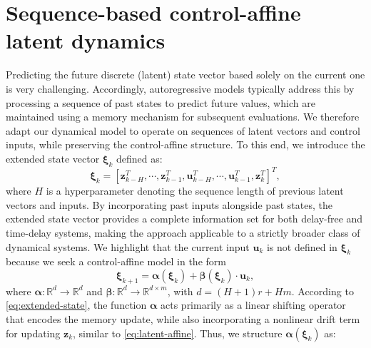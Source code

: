 \documentclass{article}
\begin{document}
\section{Sequence-based control-affine latent dynamics}
\label{sec:seq-based-affine}
Predicting the future discrete (latent) state vector based solely on the current one is very challenging. 
Accordingly, autoregressive models typically address this by processing a sequence of past states to predict future values, which are maintained using a memory mechanism for subsequent evaluations.
We therefore adapt our dynamical model to operate on sequences of latent vectors and control inputs, while preserving the control-affine structure.
To this end, we introduce the extended state vector $\boldsymbol{\xi}_k$ defined as:
\begin{equation}
    \label{eq:extended-state}
    \boldsymbol{\xi}_k = [\mathbf{z}^T_{k-H}, \cdots, \mathbf{z}^T_{k-1}, \mathbf{u}^T_{k-H}, \cdots, \mathbf{u}^T_{k-1},\mathbf{z}_k^T]^T,
\end{equation}
where $H$ is a hyperparameter denoting the sequence length of previous latent vectors and inputs. 
By incorporating past inputs alongside past states, the extended state vector provides a complete information set for both delay-free and time-delay systems, making the approach applicable to a strictly broader class of dynamical systems.
We highlight that the current input $\mathbf{u}_k$ is not defined in $\boldsymbol{\xi}_k$ because we seek a control-affine model in the form
\begin{equation}
    \label{eq:affine-extended}
    \boldsymbol{\xi}_{k+1} = \boldsymbol{\alpha}(\boldsymbol{\xi}_k) + \boldsymbol{\beta}(\boldsymbol{\xi}_k)\cdot\mathbf{u}_k,
\end{equation}
where $\boldsymbol{\alpha}:\mathbb{R}^{d} \rightarrow \mathbb{R}^{d}$ and $\boldsymbol{\beta}:\mathbb{R}^{d} \rightarrow \mathbb{R}^{d \times m}$, with $d=(H+1)r + H m$.
According to \eqref{eq:extended-state}, the function $\boldsymbol{\alpha}$ acts primarily as a linear shifting operator that encodes the memory update, while also incorporating a nonlinear drift term for updating $\mathbf{z}_k$, similar to \eqref{eq:latent-affine}. Thus, we structure $\boldsymbol{\alpha}(\boldsymbol{\xi}_k)$ as:
\end{document}
